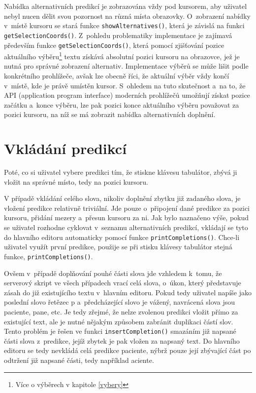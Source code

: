 \documentclass[a4paper,11pt,openany]{book} %
\newcommand\exmp{\textsf}
\begin{document}
Nabídka alternativních predikcí je zobrazována vždy pod kursorem, aby uživatel nebyl nucen dělit svou pozornost na různá místa obrazovky. O~zobrazení nabídky v~místě kursoru se stará funkce {\tt show\-Alternatives()}, která je závislá na funkci {\tt get\-Selection\-Coords()}. Z~pohledu problematiky implementace je zajímavá především funkce {\tt get\-Selection\-Coords()}, která pomocí zjišťování pozice aktuálního výběru\footnote{Více o výběrech v kapitole \ref{vybery}} textu získává absolutní pozici kursoru na obrazovce, jež je nutná pro správné zobrazení alternativ. Implementace výběrů se může lišit podle konkrétního prohlížeče, avšak lze obecně říci, že aktuální výběr vždy končí v~místě, kde je právě umístěn kursor. S~ohledem na tuto skutečnost a~na to, že API (application program interface) moderních prohlížečů umožňují získat pozice začátku a~konce výběru, lze pak pozici konce aktuálního výběru považovat za pozici kursoru, na níž se má zobrazit nabídka alternativních doplnění. 

\section{Vkládání predikcí}

Poté, co si uživatel vybere predikci tím, že stiskne klávesu tabulátor, zbývá ji vložit na správné místo, tedy na pozici kursoru.

V případě vkládání celého slova, nikoliv doplnění zbytku již zadaného slova, je vložení predikce relativně triviální. Jde pouze o~připojení dané predikce za pozici kursoru, přidání mezery a~přesun kursoru za ni. Jak bylo naznačeno výše, pokud se uživatel rozhodne cyklovat v~seznamu alternativních predikcí, vkládají se tyto do hlavního editoru automaticky pomocí funkce {\tt printCompletions()}. Chce-li uživatel využít první predikce, použije se při stisku klávesy tabulátor stejná funkce, {\tt printCompletions()}. 

Ovšem v~případě doplňování pouhé části slova jde vzhledem k~tomu, že serverový skript ve všech případech vrací celá slova, o~úkon, který představuje zásah do již existujícího textu v~hlavním editoru. Pokud tedy uživatel napíše jako poslední slovo řetězec \exmp{p} a~předcházející slovo je \exmp{vážený}, navrácená slova jsou \exmp{paciente}, \exmp{pane}, etc. Je tedy zřejmé, že nelze zvolenou predikci vložit přímo za existující text, ale je nutné nějakým způsobem zabránit duplikaci částí slov. Tento problém je řešen ve funkci {\tt insertCompletion()} smazáním již napsané části slova z~predikce, jejíž zbytek je pak vložen za napsaný text. Do hlavního editoru se tedy nevkládá celá predikce \exmp{paciente}, nýbrž pouze její zbývající část po odtržení již napsané části, tedy například \exmp{aciente}.
\end{document}
